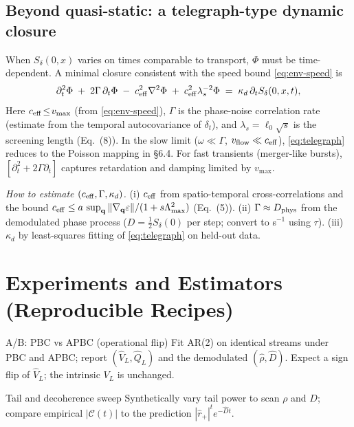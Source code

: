 \documentclass[11pt]{article}
\begin{document}
\subsection{Beyond quasi-static: a telegraph-type dynamic closure}
When $S_\delta(0,x)$ varies on times comparable to transport, $\Phi$ must be time-dependent.
A minimal closure consistent with the speed bound \eqref{eq:env-speed} is
\begin{equation}
\partial_t^2 \Phi\;+\;2\Gamma\,\partial_t \Phi\;-\;c_{\rm eff}^2 \nabla^2 \Phi
\;+\;c_{\rm eff}^2 \lambda_s^{-2}\Phi\;=\;\kappa_d\,\partial_t S_\delta(0,x,t),
\label{eq:telegraph}
\end{equation}
Here $c_{\rm eff}\!\le\!v_{\max}$ (from \eqref{eq:env-speed}), $\Gamma$ is the phase-noise correlation
rate (estimate from the temporal autocovariance of $\delta_t$), and $\lambda_s=\ell_0\sqrt{s}$ is the
screening length (Eq.~(8)). In the slow limit ($\omega\ll \Gamma$, $v_{\rm flow}\ll c_{\rm eff}$),
\eqref{eq:telegraph} reduces to the Poisson mapping in \S6.4. For fast transients (merger-like bursts),
$[\partial_t^2+2\Gamma\partial_t]$ captures retardation and damping limited by $v_{\max}$.

\noindent\emph{How to estimate $(c_{\rm eff},\Gamma,\kappa_d)$.} 
(i) $c_{\rm eff}$ from spatio-temporal cross-correlations and the bound $c_{\rm eff}\le a\,\sup_{\mathbf q}\|\nabla_{\mathbf q}\varepsilon\|/(1+s\Lambda_{\max}^2)$ (Eq.~(5)).
(ii) $\Gamma\approx D_{\rm phys}$ from the demodulated phase process ($D= \tfrac12 S_\delta(0)$ per step; convert to s$^{-1}$ using $\tau$).
(iii) $\kappa_d$ by least-squares fitting of \eqref{eq:telegraph} on held-out data.


\section{Experiments and Estimators (Reproducible Recipes)}
\begin{mybox}{A/B: PBC vs APBC (operational flip)}
Fit AR(2) on identical streams under PBC and APBC; report $(\widehat V_L,\widehat Q_L)$ and the demodulated $(\widehat\rho,\widehat D)$.
Expect a sign flip of $\widehat V_L$; the intrinsic $V_L$ is unchanged.
\end{mybox}

\begin{mybox}{Tail and decoherence sweep}
Synthetically vary tail power to scan $\rho$ and $D$; compare empirical $|\mathcal C(t)|$ to the prediction $|\widehat r_+|^t e^{-\widehat D t}$.
\end{mybox}
\end{document}
